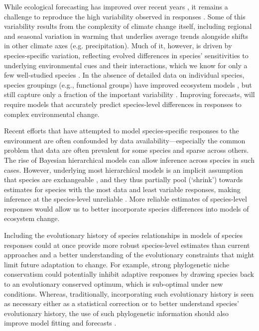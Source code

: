 \documentclass[11pt]{article}
\begin{document}
While ecological forecasting has improved over recent years \citep{dietze2017ecological,lewis2022power}, it remains a challenge to reproduce the high variability observed in responses \citep{IPCC:2014sm}. Some of this variability results from the complexity of climate change itself, including regional and seasonal variation in warming that underlies average trends alongside shifts in other climate axes (e.g. precipitation). Much of it, however, is driven by species-specific variation, reflecting evolved differences in species' sensitivities to underlying environmental cues and their interactions, which we know for only a few well-studied species \citep{chuinearees,ettinger2020}. In the absence of detailed data on individual species, species groupings (e.g., functional groups) have improved ecosystem models \citep{ed2001,griffith2020}, but still capture only a fraction of the important variability \citep{fuccillo2022}. Improving forecasts, will require models that accurately predict species-level differences in responses to complex environmental change.

Recent efforts that have attempted to model species-specific responses to the environment \citep{diez2012forecasting} are often confounded by data availability---especially the common problem that data are often prevalent for some species and sparse across others. The rise of Bayesian hierarchical models can allow inference across species in such cases. However, underlying most hierarchical models is an implicit assumption that species are exchangeable \citep{gelman2006}, and they thus partially pool (`shrink') towards estimates for species with the most data and least variable responses, making inference at the species-level unreliable \citep{ettinger2020}. More reliable estimates of species-level responses would allow us to better incorporate species differences into models of ecosystem change. 

Including the evolutionary history of species relationships in models of species responses could at once provide more robust species-level estimates than current approaches and a better understanding of the evolutionary constraints that might limit future adaptation to change. For example, strong phylogenetic niche conservatism \citep{wiens2010niche} could potentially inhibit adaptive responses by drawing species back to an evolutionary conserved optimum, which is sub-optimal under new conditions. %
Whereas, traditionally, incorporating such evolutionary history is seen as necessary either as a statistical correction or to better understand species' evolutionary history, the use of such phylogenetic information should also improve model fitting and forecasts \citep{freckleton2002phylogenetic}.
\end{document}

